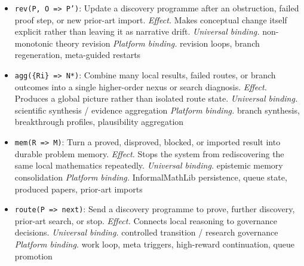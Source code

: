 \documentclass[11pt]{article}
\begin{document}
\begin{itemize}[leftmargin=*,itemsep=0.25em]
\item \texttt{rev(P, O => P')}: Update a discovery programme after an obstruction, failed proof step, or new prior-art import. \emph{Effect.} Makes conceptual change itself explicit rather than leaving it as narrative drift. \emph{Universal binding.} non-monotonic theory revision \emph{Platform binding.} revision loops, branch regeneration, meta-guided restarts
\item \texttt{agg(\{Ri\} => N*)}: Combine many local results, failed routes, or branch outcomes into a single higher-order nexus or search diagnosis. \emph{Effect.} Produces a global picture rather than isolated route state. \emph{Universal binding.} scientific synthesis / evidence aggregation \emph{Platform binding.} branch synthesis, breakthrough profiles, plausibility aggregation
\item \texttt{mem(R => M)}: Turn a proved, disproved, blocked, or imported result into durable problem memory. \emph{Effect.} Stops the system from rediscovering the same local mathematics repeatedly. \emph{Universal binding.} epistemic memory consolidation \emph{Platform binding.} InformalMathLib persistence, queue state, produced papers, prior-art imports
\item \texttt{route(P => next)}: Send a discovery programme to prove, further discovery, prior-art search, or stop. \emph{Effect.} Connects local reasoning to governance decisions. \emph{Universal binding.} controlled transition / research governance \emph{Platform binding.} work loop, meta triggers, high-reward continuation, queue promotion
\end{itemize}
\end{document}
